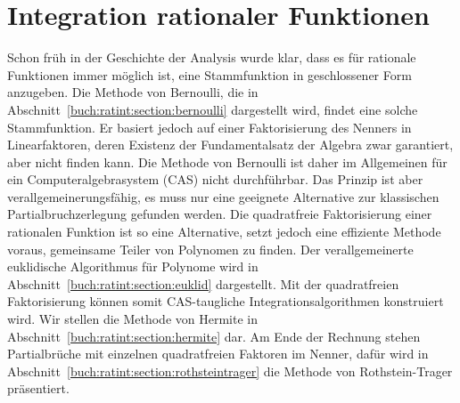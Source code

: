 %
%
%
\chapter{Integration rationaler Funktionen
\label{chapter:ratint}}
Schon früh in der Geschichte der Analysis wurde klar, dass es für
rationale Funktionen immer möglich ist, eine Stammfunktion in 
geschlossener Form anzugeben.
Die Methode von Bernoulli, die in
Abschnitt~\ref{buch:ratint:section:bernoulli} dargestellt wird,
findet eine solche Stammfunktion.
Er basiert jedoch auf einer Faktorisierung des Nenners in Linearfaktoren,
deren Existenz der Fundamentalsatz der Algebra zwar garantiert, aber
nicht finden kann.
Die Methode von Bernoulli ist daher im Allgemeinen für ein
Computeralgebrasystem (CAS) nicht durchführbar.
Das Prinzip ist aber verallgemeinerungsfähig, es muss nur eine geeignete
Alternative zur klassischen Partialbruchzerlegung gefunden werden.
Die quadratfreie Faktorisierung einer rationalen Funktion ist so eine
Alternative, setzt jedoch eine effiziente Methode voraus, gemeinsame
Teiler von Polynomen zu finden.
Der verallgemeinerte euklidische Algorithmus für Polynome wird in
Abschnitt~\ref{buch:ratint:section:euklid} dargestellt.
Mit der quadratfreien Faktorisierung können somit CAS-taugliche
Integrationsalgorithmen konstruiert wird.
Wir stellen die Methode von Hermite in
Abschnitt~\ref{buch:ratint:section:hermite} dar.
Am Ende der Rechnung stehen Partialbrüche mit einzelnen quadratfreien
Faktoren im Nenner, dafür wird in
Abschnitt~\ref{buch:ratint:section:rothsteintrager}
die Methode von Rothstein-Trager präsentiert.






\uebungsabschnitt

\begin{uebungsaufgaben}
\end{uebungsaufgaben}
\enduebungsabschnitt


